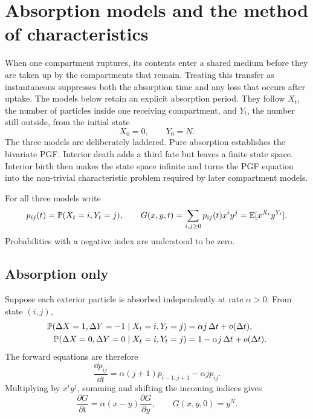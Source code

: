 \section{Absorption models and the method of characteristics}
\label{sec:moc}

When one compartment ruptures, its contents enter a shared medium before they are
taken up by the compartments that remain.  Treating this transfer as instantaneous
suppresses both the absorption time and any loss that occurs after uptake.  The
models below retain an explicit absorption period.  They follow \(X_t\), the number
of particles inside one receiving compartment, and \(Y_t\), the number still
outside, from the initial state
\begin{equation}
  X_0=0,
  \qquad Y_0=N.
  \label{eq:abs-initial-state}
\end{equation}
The three models are deliberately laddered.  Pure absorption establishes the
bivariate PGF.  Interior death adds a third fate but leaves a finite state space.
Interior birth then makes the state space infinite and turns the PGF equation into
the non-trivial characteristic problem required by later compartment models.

For all three models write
\begin{equation}
  p_{ij}(t)=\mathbb{P}(X_t=i,Y_t=j),
  \qquad
  G(x,y,t)=\sum_{i,j\geq0}p_{ij}(t)x^iy^j
  =\mathbb{E}[x^{X_t}y^{Y_t}].
  \label{pgfDef}
\end{equation}
Probabilities with a negative index are understood to be zero.

\subsection{Absorption only}
\label{sec:absonly}

Suppose each exterior particle is absorbed independently at rate \(\alpha>0\).
From state \((i,j)\),
\begin{align}
  \mathbb{P}(\Delta X=1,\Delta Y=-1\mid X_t=i,Y_t=j)
  &=\alpha j\,\Delta t+o(\Delta t),
  \label{eq:abs-short-time}\\
  \mathbb{P}(\Delta X=0,\Delta Y=0\mid X_t=i,Y_t=j)
  &=1-\alpha j\,\Delta t+o(\Delta t).
  \nonumber
\end{align}
The forward equations are therefore
\begin{equation}
  \frac{\dd p_{ij}}{\dd t}
  =\alpha(j+1)p_{i-1,j+1}-\alpha j p_{ij}.
  \label{eq:abs-master}
\end{equation}
Multiplying by \(x^iy^j\), summing and shifting the incoming indices gives
\begin{equation}
  \frac{\partial G}{\partial t}
  =\alpha(x-y)\frac{\partial G}{\partial y},
  \qquad G(x,y,0)=y^N.
  \label{PDE1}
\end{equation}

